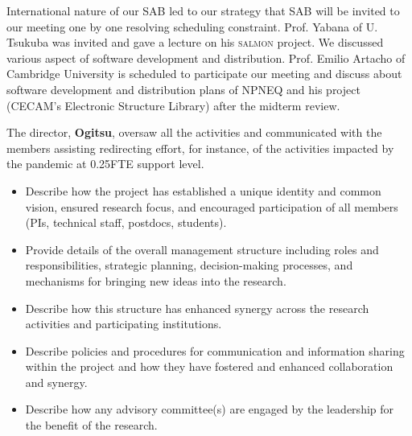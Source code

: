 International nature of our SAB led to our strategy that SAB will be invited to our meeting one by one resolving scheduling constraint. 
Prof. Yabana of U. Tsukuba was invited and gave a lecture on his \textsc{salmon} project. 
We discussed various aspect of software development and distribution. 
Prof. Emilio Artacho of Cambridge University is scheduled to participate our meeting and discuss about software development and distribution plans of NPNEQ and his project (CECAM's Electronic Structure Library) after the midterm review.

The director, {\bf Ogitsu}, oversaw all the activities and communicated with the members assisting redirecting effort, for instance, of the activities impacted by the pandemic at 0.25FTE support level.

{\small\color{red}
\begin{itemize}
    \item Describe how the project has established a unique identity and common vision, ensured research focus, and encouraged participation of all members (PIs, technical staff, postdocs, students).
    \item Provide details of the overall management structure including roles and responsibilities, strategic planning, decision-making processes, and mechanisms for bringing new ideas into the research.
    \item Describe how this structure has enhanced synergy across the research activities and participating institutions.
    \item Describe policies and procedures for communication and information sharing within the project and how they have fostered and enhanced collaboration and synergy.
    \item Describe how any advisory committee(s) are engaged by the leadership for the benefit of the research.
    
\end{itemize}
}

\clearpage

